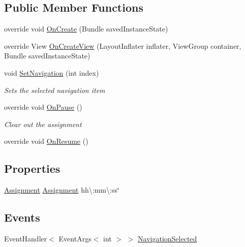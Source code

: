 \subsection*{Public Member Functions}
\begin{DoxyCompactItemize}
\item 
override void \hyperlink{class_field_service_1_1_android_1_1_fragments_1_1_navigation_fragment_ab2e98aa024e37396433342232943485f}{On\+Create} (Bundle saved\+Instance\+State)
\item 
override View \hyperlink{class_field_service_1_1_android_1_1_fragments_1_1_navigation_fragment_ab7b1727cfdc0af4fcd3285a5d1b5094e}{On\+Create\+View} (Layout\+Inflater inflater, View\+Group container, Bundle saved\+Instance\+State)
\item 
void \hyperlink{class_field_service_1_1_android_1_1_fragments_1_1_navigation_fragment_aa599540dd37dbd223b1a78671278ebbc}{Set\+Navigation} (int index)
\begin{DoxyCompactList}\small\item\em Sets the selected navigation item \end{DoxyCompactList}\item 
override void \hyperlink{class_field_service_1_1_android_1_1_fragments_1_1_navigation_fragment_a3e397484e1255800f92c32d6356dec6b}{On\+Pause} ()
\begin{DoxyCompactList}\small\item\em Clear out the assignment \end{DoxyCompactList}\item 
override void \hyperlink{class_field_service_1_1_android_1_1_fragments_1_1_navigation_fragment_a719ffc5c674169a79aaa89d5f5cef87c}{On\+Resume} ()
\end{DoxyCompactItemize}
\subsection*{Properties}
\begin{DoxyCompactItemize}
\item 
\hyperlink{class_field_service_1_1_data_1_1_assignment}{Assignment} \hyperlink{class_field_service_1_1_android_1_1_fragments_1_1_navigation_fragment_a00cacdc6737df9d38076a490c783ad4c}{Assignment} hh\textbackslash{}\+:mm\textbackslash{}\+:ss\char`\"{}
\end{DoxyCompactItemize}
\subsection*{Events}
\begin{DoxyCompactItemize}
\item 
Event\+Handler$<$ Event\+Args$<$ int $>$ $>$ \hyperlink{class_field_service_1_1_android_1_1_fragments_1_1_navigation_fragment_aa2bfa9504918a62832e7f7c9a13f1c62}{Navigation\+Selected}
\end{DoxyCompactItemize}



